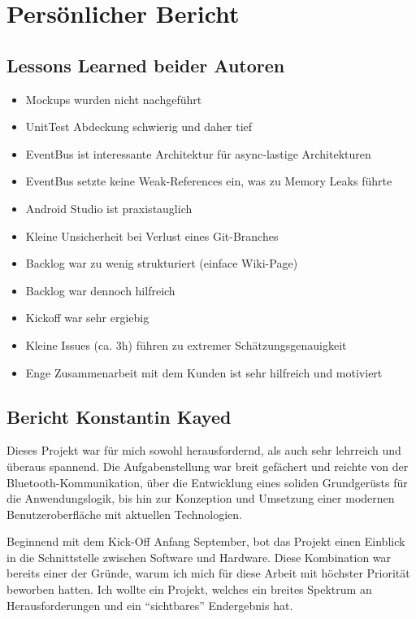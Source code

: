 \section{Persönlicher Bericht}
\label{Persönlicher Bericht}

\subsection{Lessons Learned beider Autoren}
\label{sub:lessons_learned}

\begin{itemize}
\item{Mockups wurden nicht nachgeführt}
\item{UnitTest Abdeckung schwierig und daher tief}
\item{EventBus ist interessante Architektur für async-lastige Architekturen}
\item{EventBus setzte keine Weak-References ein, was zu Memory Leaks führte}
\item{Android Studio ist praxistauglich}
\item{Kleine Unsicherheit bei Verlust eines Git-Branches}
\item{Backlog war zu wenig strukturiert (einface Wiki-Page)}
\item{Backlog war dennoch hilfreich}
\item{Kickoff war sehr ergiebig}
\item{Kleine Issues (ca. 3h) führen zu extremer Schätzungsgenauigkeit}
\item{Enge Zusammenarbeit mit dem Kunden ist sehr hilfreich und motiviert}
\end{itemize}

\subsection{Bericht Konstantin Kayed}

Dieses Projekt war für mich sowohl herausfordernd, als auch sehr lehrreich und überaus spannend. Die Aufgabenstellung war breit gefächert und reichte von der Bluetooth-Kommunikation, über die Entwicklung eines soliden Grundgerüsts für die Anwendungslogik, bis hin zur Konzeption und Umsetzung einer modernen Benutzeroberfläche mit aktuellen Technologien.

Beginnend mit dem Kick-Off Anfang September, bot das Projekt einen Einblick in die Schnittstelle zwischen Software und Hardware. Diese Kombination war bereits einer der Gründe, warum ich mich für diese Arbeit mit höchster Priorität beworben hatten. Ich wollte ein Projekt, welches ein breites Spektrum an Herausforderungen und ein \enquote{sichtbares} Endergebnis hat.

